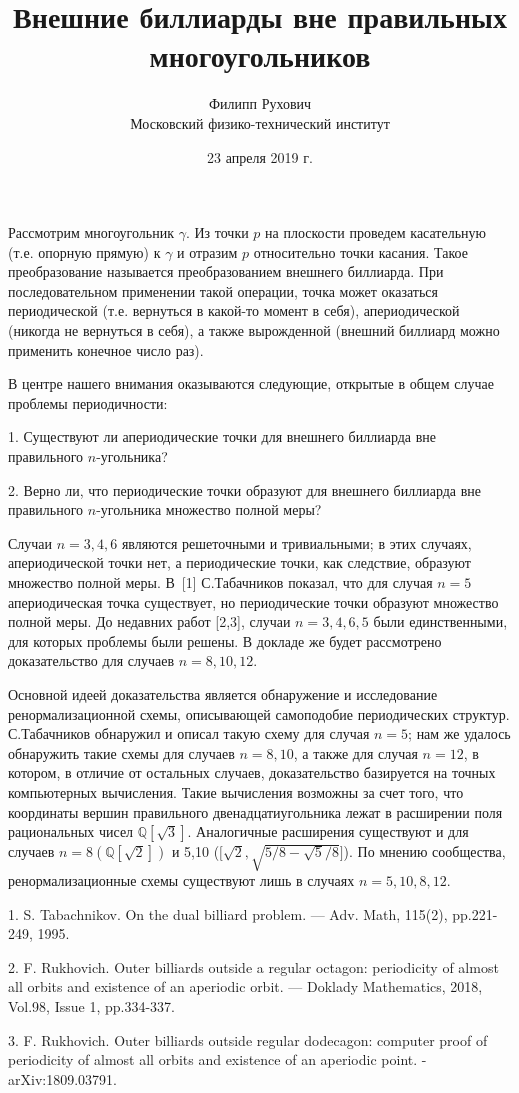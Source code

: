 \documentclass{article}
\title{Внешние биллиарды вне правильных многоугольников}
\author{Филипп Рухович\\Московский физико-технический институт}
\date{23 апреля 2019 г.}
\begin{document}
\maketitle

Рассмотрим многоугольник $\gamma$. Из точки $p$ на плоскости проведем касательную (т.е. опорную прямую) к $\gamma$ и отразим $p$ относительно точки касания. Такое преобразование называется преобразованием внешнего биллиарда. При последовательном применении такой операции, точка может оказаться периодической (т.е. вернуться в какой-то момент в себя), апериодической (никогда не вернуться в себя), а также вырожденной (внешний биллиард можно применить конечное число раз).

В центре нашего внимания оказываются следующие, открытые в общем случае проблемы периодичности:

1. Существуют ли апериодические точки для внешнего биллиарда вне правильного $n$-угольника?

2. Верно ли, что периодические точки образуют для внешнего биллиарда вне правильного $n$-угольника множество полной меры?

Случаи $n = 3, 4, 6$ являются решеточными и тривиальными; в этих случаях, апериодической точки нет, а периодические точки, как следствие, образуют множество полной меры. В~[1] С.Табачников показал, что для случая $n = 5$ апериодическая точка существует, но периодические точки образуют множество полной меры. До недавних работ [2,3], случаи $n = 3,4,6,5$ были единственными, для которых проблемы были решены. В докладе же будет рассмотрено доказательство для случаев $n = 8, 10, 12$.

Основной идеей доказательства является обнаружение и исследование ренормализационной схемы, описывающей самоподобие периодических структур. С.Табачников обнаружил и описал такую схему для случая $n = 5$; нам же удалось обнаружить такие схемы для случаев $n = 8, 10$, а также для случая $n = 12$, в котором, в отличие от остальных случаев, доказательство базируется на точных компьютерных вычисления. Такие вычисления возможны за счет того, что координаты вершин правильного
двенадцатиугольника лежат в расширении поля рациональных чисел $\mathbb{Q}[\sqrt 3]$. Аналогичные 
расширения существуют и для случаев $n = 8 (\mathbb{Q}[\sqrt 2])$ и 5,10 ($\mathbb[\sqrt2,\sqrt{5/8 - \sqrt5/8}]$). По мнению сообщества, ренормализационные схемы существуют лишь в случаях $n = 5, 10, 8, 12$.


1. S. Tabachnikov. On the dual billiard problem. — Adv. Math, 115(2), pp.221-249, 1995.

2. F. Rukhovich. Outer billiards outside a regular octagon: periodicity of almost all orbits and existence of an aperiodic orbit. — Doklady Mathematics, 2018, Vol.98, Issue 1, pp.334-337.

3. F. Rukhovich. Outer billiards outside regular dodecagon: computer proof of periodicity of almost all orbits and existence of an aperiodic point. - arXiv:1809.03791.
\end{document}
